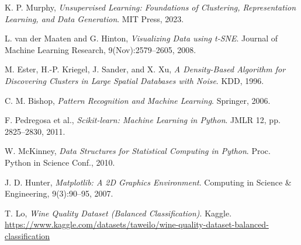 \documentclass[12pt]{article}
\begin{document}
\begin{thebibliography}{9}

K. P. Murphy, \textit{Unsupervised Learning: Foundations of Clustering, Representation Learning, and Data Generation}. MIT Press, 2023.

L. van der Maaten and G. Hinton, \textit{Visualizing Data using t-SNE}. Journal of Machine Learning Research, 9(Nov):2579–2605, 2008.

M. Ester, H.-P. Kriegel, J. Sander, and X. Xu, \textit{A Density-Based Algorithm for Discovering Clusters in Large Spatial Databases with Noise}. KDD, 1996.

C. M. Bishop, \textit{Pattern Recognition and Machine Learning}. Springer, 2006.

F. Pedregosa et al., \textit{Scikit-learn: Machine Learning in Python}. JMLR 12, pp. 2825–2830, 2011.

W. McKinney, \textit{Data Structures for Statistical Computing in Python}. Proc. Python in Science Conf., 2010.

J. D. Hunter, \textit{Matplotlib: A 2D Graphics Environment}. Computing in Science \& Engineering, 9(3):90–95, 2007.

T. Lo, \textit{Wine Quality Dataset (Balanced Classification)}. Kaggle. \url{https://www.kaggle.com/datasets/taweilo/wine-quality-dataset-balanced-classification}

\end{thebibliography}
\end{document}

